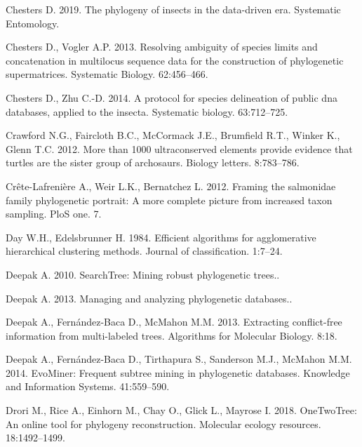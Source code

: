 \documentclass[]{article}
\begin{document}
\leavevmode\hypertarget{ref-chesters2019phylogeny}{}%
Chesters D. 2019. The phylogeny of insects in the data-driven era. Systematic Entomology.

\leavevmode\hypertarget{ref-chesters2013resolving}{}%
Chesters D., Vogler A.P. 2013. Resolving ambiguity of species limits and concatenation in multilocus sequence data for the construction of phylogenetic supermatrices. Systematic Biology. 62:456--466.

\leavevmode\hypertarget{ref-chesters2014protocol}{}%
Chesters D., Zhu C.-D. 2014. A protocol for species delineation of public dna databases, applied to the insecta. Systematic biology. 63:712--725.

\leavevmode\hypertarget{ref-crawford2012more}{}%
Crawford N.G., Faircloth B.C., McCormack J.E., Brumfield R.T., Winker K., Glenn T.C. 2012. More than 1000 ultraconserved elements provide evidence that turtles are the sister group of archosaurs. Biology letters. 8:783--786.

\leavevmode\hypertarget{ref-crete2012salmonidae}{}%
Crête-Lafrenière A., Weir L.K., Bernatchez L. 2012. Framing the salmonidae family phylogenetic portrait: A more complete picture from increased taxon sampling. PloS one. 7.

\leavevmode\hypertarget{ref-day1984efficient}{}%
Day W.H., Edelsbrunner H. 1984. Efficient algorithms for agglomerative hierarchical clustering methods. Journal of classification. 1:7--24.

\leavevmode\hypertarget{ref-deepak2010searchtree}{}%
Deepak A. 2010. SearchTree: Mining robust phylogenetic trees..

\leavevmode\hypertarget{ref-deepak2013managing}{}%
Deepak A. 2013. Managing and analyzing phylogenetic databases..

\leavevmode\hypertarget{ref-deepak2013extracting}{}%
Deepak A., Fernández-Baca D., McMahon M.M. 2013. Extracting conflict-free information from multi-labeled trees. Algorithms for Molecular Biology. 8:18.

\leavevmode\hypertarget{ref-deepak2014evominer}{}%
Deepak A., Fernández-Baca D., Tirthapura S., Sanderson M.J., McMahon M.M. 2014. EvoMiner: Frequent subtree mining in phylogenetic databases. Knowledge and Information Systems. 41:559--590.

\leavevmode\hypertarget{ref-drori2018onetwotree}{}%
Drori M., Rice A., Einhorn M., Chay O., Glick L., Mayrose I. 2018. OneTwoTree: An online tool for phylogeny reconstruction. Molecular ecology resources. 18:1492--1499.
\end{document}
